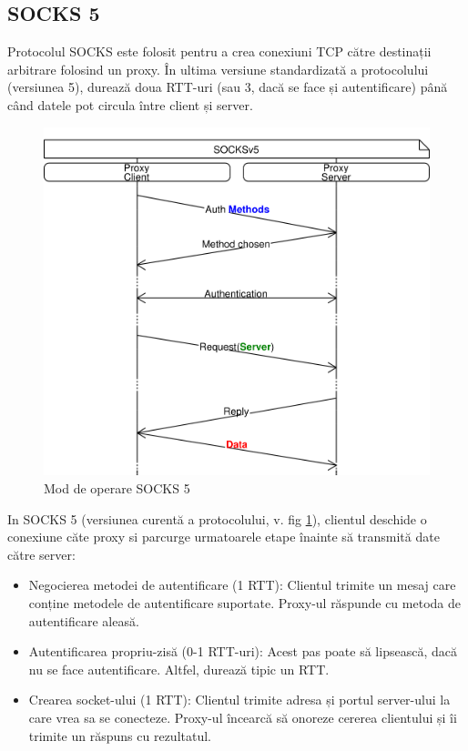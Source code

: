 \subsection{SOCKS 5}

Protocolul SOCKS este folosit pentru a crea conexiuni TCP către destinații arbitrare folosind un proxy.
În ultima versiune standardizată a protocolului (versiunea 5), durează doua RTT-uri (sau 3, dacă se face și autentificare) până când datele pot circula între client și server.

\begin{figure}[h]
	\centering
	\includegraphics[scale=0.7]{figures/socks/socks5op.png}
	\caption{Mod de operare SOCKS 5}
    	\label{fig:socks5op}
\end{figure}

In SOCKS 5 (versiunea curentă a protocolului, v. fig \ref{fig:socks5op}), clientul deschide o conexiune căte proxy si parcurge urmatoarele etape înainte să transmită date către server:
\begin{itemize}
	\item Negocierea metodei de autentificare (1 RTT): Clientul trimite un mesaj care conține metodele de autentificare suportate. Proxy-ul răspunde cu metoda de autentificare aleasă.
	\item Autentificarea propriu-zisă (0-1 RTT-uri): Acest pas poate să lipsească, dacă nu se face autentificare. Altfel, durează tipic un RTT.
	\item Crearea socket-ului (1 RTT): Clientul trimite adresa și portul server-ului la care vrea sa se conecteze. Proxy-ul încearcă să onoreze cererea clientului și îi trimite un răspuns cu rezultatul.
\end{itemize}


